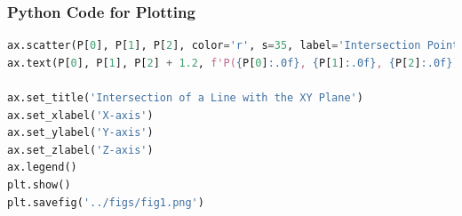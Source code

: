 \documentclass{beamer}
\theoremstyle{remark}
\numberwithin{equation}{section}
\begin{document}
\begin{frame}[fragile]
\frametitle{Python Code for Plotting}
\begin{lstlisting}[language=Python] 
ax.scatter(P[0], P[1], P[2], color='r', s=35, label='Intersection Point')
ax.text(P[0], P[1], P[2] + 1.2, f'P({P[0]:.0f}, {P[1]:.0f}, {P[2]:.0f})', ha='center')

ax.set_title('Intersection of a Line with the XY Plane')
ax.set_xlabel('X-axis')
ax.set_ylabel('Y-axis')
ax.set_zlabel('Z-axis')
ax.legend()
plt.show()
plt.savefig('../figs/fig1.png')
\end{lstlisting}
\end{frame}
\end{document}
